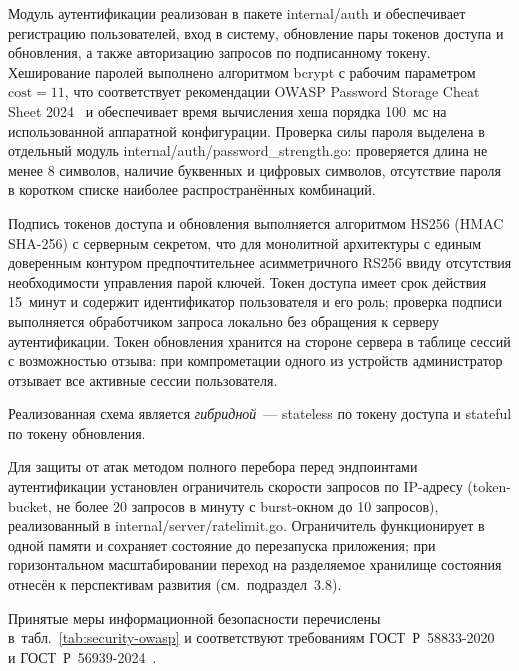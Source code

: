 Модуль аутентификации реализован в пакете internal/auth
и обеспечивает регистрацию пользователей, вход в систему,
обновление пары токенов доступа и обновления, а также авторизацию
запросов по подписанному токену. Хеширование паролей выполнено
алгоритмом bcrypt с рабочим параметром $\text{cost} = 11$, что
соответствует рекомендации OWASP Password Storage Cheat Sheet
2024~\cite{owasp_pwstorage} и обеспечивает время вычисления хеша
порядка 100~мс на использованной аппаратной конфигурации.
Проверка силы пароля выделена в отдельный модуль
internal/auth/password\_strength.go: проверяется длина
не менее 8 символов, наличие буквенных и цифровых символов,
отсутствие пароля в коротком списке наиболее распространённых
комбинаций.

Подпись токенов доступа и обновления выполняется алгоритмом
HS256 (HMAC SHA-256) с серверным секретом, что для монолитной
архитектуры с единым доверенным контуром предпочтительнее
асимметричного RS256 ввиду отсутствия необходимости управления
парой ключей. Токен доступа имеет срок действия 15~минут и
содержит идентификатор пользователя и его роль; проверка подписи
выполняется обработчиком запроса локально без обращения к серверу
аутентификации. Токен обновления хранится на стороне сервера
в таблице сессий с возможностью отзыва: при компрометации одного
из устройств администратор отзывает все активные сессии пользователя.

Реализованная схема является \emph{гибридной}~--- stateless
по токену доступа и stateful по токену обновления.

Для защиты от атак методом полного перебора перед эндпоинтами
аутентификации установлен ограничитель скорости запросов по
IP-адресу (token-bucket, не более 20 запросов в минуту с burst-окном
до 10 запросов), реализованный в internal/server/ratelimit.go.
Ограничитель функционирует в одной памяти и сохраняет состояние
до перезапуска приложения; при горизонтальном масштабировании
переход на разделяемое хранилище состояния отнесён к перспективам
развития (см.~подраздел~3.8).

Принятые меры информационной безопасности перечислены
в~табл.~\ref{tab:security-owasp} и соответствуют требованиям
ГОСТ~Р~58833-2020~\cite{gost58833} и ГОСТ~Р~56939-2024~\cite{gost56939}.

